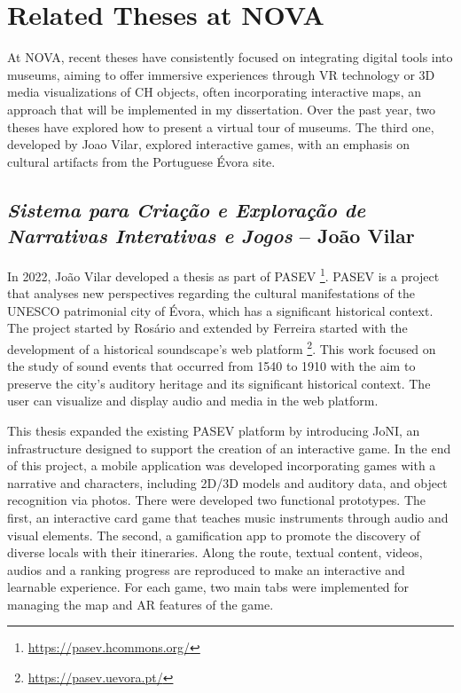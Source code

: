\section{Related Theses at NOVA}
\label{sec:thesis_nova}


At NOVA, recent theses have consistently focused on integrating digital tools into museums, aiming to offer immersive experiences through \gls{VR} technology or \gls{3D} media visualizations 
of \gls{CH} objects, often incorporating interactive maps, an approach that will be implemented in my dissertation. Over the past year, two theses have explored how to 
present a virtual tour of museums. The third one, developed by Joao Vilar, explored interactive games, with an emphasis on cultural artifacts from the Portuguese Évora site.


\subsection{\textit{Sistema para Criação e Exploração de Narrativas Interativas e Jogos} – João Vilar}
\label{sec:thesis1_nova}


In 2022, João Vilar developed a thesis as part of \gls{PASEV} \footnote{\url{https://pasev.hcommons.org/}}. \gls{PASEV} is a project that analyses new perspectives regarding the cultural manifestations of the UNESCO patrimonial city of Évora,
which has a significant historical context. The project started by Rosário and extended by Ferreira started with the development of a historical soundscape's web platform \footnote{\url{https://pasev.uevora.pt/}}. 
This work focused on the study of sound events that occurred from 1540 to 1910 with the aim to preserve the city's auditory heritage and its significant historical context. The user can
visualize and display audio and media in the web platform. ~\cite{rodrigues2021using}

  
This thesis expanded the existing \gls{PASEV} platform by introducing JoNI, an infrastructure designed to support the creation of an interactive game. In the end of this project, a mobile 
application was developed incorporating games with a narrative and characters, including \gls{2D}/\gls{3D} models and auditory data, and object recognition via photos. There were developed two 
functional prototypes. The first, an interactive card game that teaches music instruments through audio and visual elements. The second, a gamification app to promote the discovery 
of diverse locals with their itineraries.  Along the route, textual content, videos, audios and a ranking progress are reproduced to make an interactive and learnable experience. 
For each game, two main tabs were implemented for managing the map and \gls{AR} features of the game. ~\cite{tese_jogosVilar2022}

